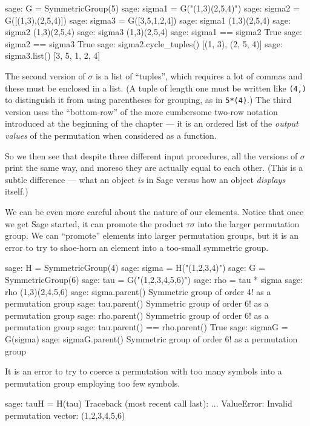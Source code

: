%
\begin{sageexample}
sage: G = SymmetricGroup(5)
sage: sigma1 = G("(1,3)(2,5,4)")
sage: sigma2 = G([(1,3),(2,5,4)])
sage: sigma3 = G([3,5,1,2,4])
sage: sigma1
(1,3)(2,5,4)
sage: sigma2
(1,3)(2,5,4)
sage: sigma3
(1,3)(2,5,4)
sage: sigma1 == sigma2
True
sage: sigma2 == sigma3
True
sage: sigma2.cycle_tuples()
[(1, 3), (2, 5, 4)]
sage: sigma3.list()
[3, 5, 1, 2, 4]
\end{sageexample}
%
The second version of $\sigma$ is a list of ``tuples'', which requires a lot of commas and these must be enclosed in a list.  (A tuple of length one must be written like \verb?(4,)? to distinguish it from using parentheses for grouping, as in \verb?5*(4)?.)  The third version uses the ``bottom-row'' of the more cumbersome two-row notation introduced at the beginning of the chapter --- it is an ordered list of the \emph{output values} of the permutation when considered as a function.\par
%
So we then see that despite three different input procedures, all the versions of $\sigma$ print the same way, and moreso they are actually equal to each other.  (This is a subtle difference --- what an object \emph{is} in Sage versus how an object \emph{displays} itself.)\par
%
We can be even more careful about the nature of our elements.  Notice that once we get Sage started, it can promote the product $\tau\sigma$ into the larger permutation group.  We can ``promote'' elements into larger permutation groups, but it is an error to try to shoe-horn an element into a too-small symmetric group.
%
\begin{sageexample}
sage: H = SymmetricGroup(4)
sage: sigma = H("(1,2,3,4)")
sage: G = SymmetricGroup(6)
sage: tau = G("(1,2,3,4,5,6)")
sage: rho = tau * sigma
sage: rho
(1,3)(2,4,5,6)
sage: sigma.parent()
Symmetric group of order 4! as a permutation group
sage: tau.parent()
Symmetric group of order 6! as a permutation group
sage: rho.parent()
Symmetric group of order 6! as a permutation group
sage: tau.parent() == rho.parent()
True
sage: sigmaG = G(sigma)
sage: sigmaG.parent()
Symmetric group of order 6! as a permutation group
\end{sageexample}
%
It is an error to try to coerce a permutation with too many symbols into a permutation group employing too few symbols.
%
\begin{sageexample}
sage: tauH = H(tau)
Traceback (most recent call last):
...
ValueError: Invalid permutation vector: (1,2,3,4,5,6)
\end{sageexample}
